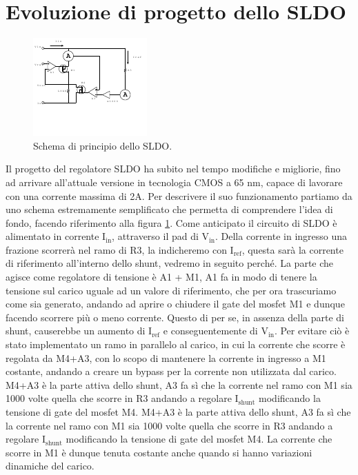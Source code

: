 \section{Evoluzione di progetto dello SLDO}
\begin{figure}[!htbp]
\centering
\includegraphics[scale=3.5]{Immagini/SLDObase}
\caption{Schema di principio dello SLDO.}
\label{SLDOprova}
\end{figure}

Il progetto del regolatore SLDO ha subito nel tempo modifiche e migliorie, fino ad arrivare all'attuale versione in tecnologia CMOS a 65 nm, capace di lavorare con una corrente massima di 2A.
Per descrivere il suo funzionamento partiamo da uno schema estremamente semplificato che permetta di comprendere l'idea di fondo, facendo riferimento alla figura \ref{SLDOprova}. 
Come anticipato il circuito di SLDO è alimentato in corrente $\mathrm{I_{in}}$, attraverso il pad di $\mathrm{V_{in}}$. 
Della corrente in ingresso una frazione scorrerà nel ramo di R3, la indicheremo con $\mathrm{I_{ref}}$, questa sarà la corrente di riferimento all'interno dello shunt, vedremo in seguito perché. 
La parte che agisce come regolatore di tensione è A1 + M1, A1 fa in modo di tenere la tensione sul carico uguale ad un valore di riferimento, che per ora trascuriamo come sia generato, andando ad aprire o chiudere il gate del mosfet M1 e dunque facendo scorrere più o meno corrente. 
Questo di per se, in assenza della parte di shunt, causerebbe un aumento di $\mathrm{I_{ref}}$ e conseguentemente di $\mathrm{V_{in}}$. 
Per evitare ciò è stato implementato un ramo in parallelo al carico, in cui la corrente che scorre è regolata da M4+A3, con lo scopo di mantenere la corrente in ingresso a M1 costante, andando a creare un bypass per la corrente non utilizzata dal carico. 
M4+A3 è la parte attiva dello shunt, A3 fa sì che la corrente nel ramo con M1 sia 1000 volte quella che scorre in R3 andando a regolare $\mathrm{I_{shunt}}$ modificando la tensione di gate del mosfet M4. 
M4+A3 è la parte attiva dello shunt, A3 fa sì che la corrente nel ramo con M1 sia 1000 volte quella che scorre in R3 andando a regolare $\mathrm{I_{shunt}}$ modificando la tensione di gate del mosfet M4. 
La corrente che scorre in M1 è dunque tenuta costante anche quando si hanno variazioni dinamiche del carico.

